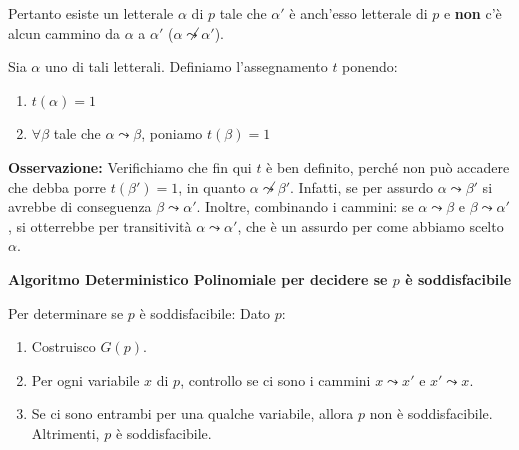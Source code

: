 Pertanto esiste un letterale $\alpha$ di $p$ tale che $\alpha'$ è anch'esso letterale di $p$ e \textbf{non} c'è alcun cammino da $\alpha$ a $\alpha'$ ($\alpha \not\leadsto \alpha'$).

Sia $\alpha$ uno di tali letterali. Definiamo l'assegnamento $t$ ponendo:
\begin{enumerate}
    \item $t(\alpha) = 1$
    \item $\forall \beta$ tale che $\alpha \leadsto \beta$, poniamo $t(\beta) = 1$
\end{enumerate}

\textbf{Osservazione:} Verifichiamo che fin qui $t$ è ben definito, perché non può accadere che debba porre $t(\beta') = 1$, in quanto $\alpha \not\leadsto \beta'$.
Infatti, se per assurdo $\alpha \leadsto \beta'$ si avrebbe di conseguenza $\beta \leadsto \alpha'$.
Inoltre, combinando i cammini: se $\alpha \leadsto \beta$ e $\beta \leadsto \alpha'$, si otterrebbe per transitività $\alpha \leadsto \alpha'$, che è un assurdo per come abbiamo scelto $\alpha$.

\begin{center}
\end{center}

\vspace{0.6cm}
\textbf{Algoritmo Deterministico Polinomiale per decidere se $p$ è soddisfacibile}

Per determinare se $p$ è soddisfacibile:
Dato $p$:
\begin{enumerate}
    \item Costruisco $G(p)$.
    \item Per ogni variabile $x$ di $p$, controllo se ci sono i cammini $x \leadsto x'$ e $x' \leadsto x$.
    \item Se ci sono entrambi per una qualche variabile, allora $p$ non è soddisfacibile. Altrimenti, $p$ è soddisfacibile.
\end{enumerate}

